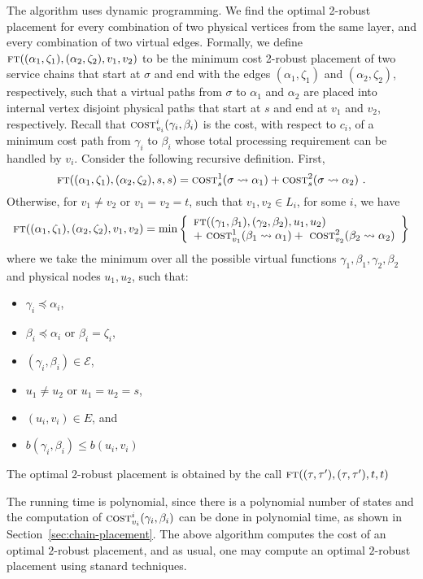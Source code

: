 \documentclass[11pt]{article}
\newcommand{\set}[1]{\left\{ #1 \right\}}
\newcommand{\calE}{\mathcal{E}}
\newcommand{\cost}{\textsc{cost}\xspace}
\newcommand{\ft}{\textsc{ft}\xspace}
\begin{document}
The algorithm uses dynamic programming.  We find the optimal 2-robust
placement for every combination of two physical vertices from the same
layer, and every combination of two virtual edges.
%
Formally, we define $\ft((\alpha_1,\zeta_1), (\alpha_2,\zeta_2), v_1,
v_2)$ to be the minimum cost 2-robust placement of two service chains
that start at $\sigma$ and end with the edges $(\alpha_1,\zeta_1)$ and
$(\alpha_2,\zeta_2)$, respectively, such that a virtual paths from
$\sigma$ to $\alpha_1$ and $\alpha_2$ are placed into internal vertex
disjoint physical paths that start at $s$ and end at $v_1$ and $v_2$,
respectively.
%
Recall that $\cost^i_{v_i}(\gamma_i,\beta_i)$ is the cost, with
respect to $c_i$, of a minimum cost path from $\gamma_i$ to $\beta_i$
whose total processing requirement can be handled by $v_i$.
%
Consider the following recursive definition.  First,
\[
\ft((\alpha_1,\zeta_1),(\alpha_2,\zeta_2),s,s)
= \cost^1_{s}(\sigma \leadsto \alpha_1) +
  \cost^2_{s}(\sigma \leadsto \alpha_2)
~.
\]
Otherwise, for $v_1 \neq v_2$ or $v_1 = v_2 = t$, such that $v_1, v_2 \in L_i$, for some
$i$, we have
\[
\ft((\alpha_1,\zeta_1),(\alpha_2,\zeta_2),v_1,v_2)
=
\min\set{
%
\begin{array}{l}
\ft((\gamma_1,\beta_1),(\gamma_2,\beta_2),u_1,u_2) \\ 
+~ \cost^1_{v_1}(\beta_1 \leadsto \alpha_1) 
+~ \cost^2_{v_2}(\beta_2 \leadsto \alpha_2)
\end{array}
}
\]
where we take the minimum over all the possible virtual functions
$\gamma_1, \beta_1, \gamma_2, \beta_2$ and physical nodes $u_1, u_2$,
such that:
\begin{itemize}
  \item $\gamma_i \preceq \alpha_i$,
  \item $\beta_i \preceq \alpha_i$ or $\beta_i = \zeta_i$,
  \item $(\gamma_i,\beta_i) \in \calE$,
  \item $u_1 \neq u_2$ or $u_1 = u_2 = s$,
  \item $(u_i,v_i) \in E$, and
  \item $b(\gamma_i,\beta_i) \leq b(u_i,v_i)$
\end{itemize}
 
The optimal $2$-robust placement is obtained by the call
$\ft((\tau,\tau'),(\tau,\tau'),t,t)$

The running time is polynomial, since there is a polynomial number of
states and the computation of $\cost^i_{v_i}(\gamma_i,\beta_i)$ can be
done in polynomial time, as shown in
Section~\ref{sec:chain-placement}.  The above algorithm computes the
cost of an optimal $2$-robust placement, and as usual, one may compute
an optimal $2$-robust placement using stanard techniques.
\end{document}
